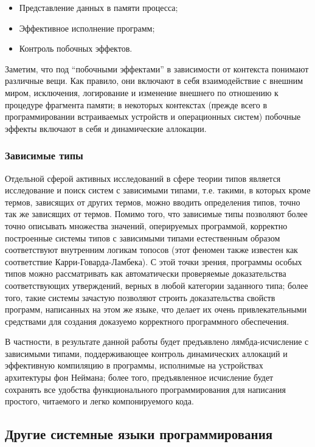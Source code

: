 \documentclass[12pt]{article}
\begin{document}
\begin{itemize}
  \item Представление данных в памяти процесса;
  \item Эффективное исполнение программ;
  \item Контроль побочных эффектов.
\end{itemize}

Заметим, что под ``побочными эффектами'' в зависимости от контекста понимают
различные вещи. Как правило, они включают в себя взаимодействие с внешним миром,
исключения, логирование и изменение внешнего по отношению к процедуре фрагмента
памяти; в некоторых контекстах (прежде всего в программировании встраиваемых
устройств и операционных систем) побочные эффекты включают в себя и динамические
аллокации.

\subsubsection{Зависимые типы}

Отдельной сферой активных исследований в сфере теории типов является
исследование и поиск систем с зависимыми типами, т.е. такими, в которых кроме
термов, зависящих от других термов, можно вводить определения типов, точно так
же зависящих от термов. Помимо того, что зависимые типы позволяют более точно
описывать множества значений, оперируемых программой, корректно построенные
системы типов с зависимыми типами естественным образом соответствуют внутренним
логикам топосов (этот феномен также известен как соответствие
Карри-Говарда-Ламбека). С этой точки зрения, программы особых типов можно
рассматривать как автоматически проверяемые доказательства соответствующих
утверждений, верных в любой категории заданного типа; более того, такие системы
зачастую позволяют строить доказательства свойств программ, написанных на этом
же языке, что делает их очень привлекательными средствами для создания доказуемо
корректного программного обеспечения.

В частности, в результате данной работы будет предъявлено лямбда-исчисление с
зависимыми типами, поддерживающее контроль динамических аллокаций и эффективную
компиляцию в программы, исполнимые на устройствах архитектуры фон Неймана; более
того, предъявленное исчисление будет сохранять все удобства функционального
программирования для написания простого, читаемого и легко компонируемого кода.

\subsection{Другие системные языки программирования}
\end{document}
